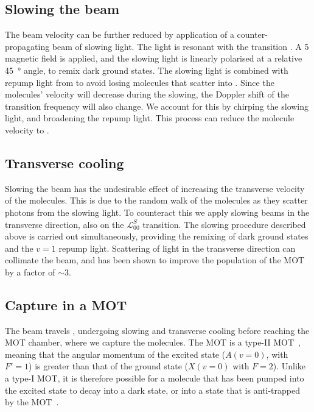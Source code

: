 \subsection*{Slowing the beam}

The beam velocity can be further reduced by application of a counter-propagating
beam of slowing light. The light is resonant with the  transition . A \SI{5}{\gauss} magnetic field is
applied, and the slowing light is linearly polarised at a relative
\SI{45}{\degree} angle, to remix dark ground states. The slowing light is
combined with repump light from 
to avoid losing molecules that scatter into . Since the molecules'
velocity will decrease during the slowing, the Doppler shift of the transition
frequency will also change. We account for this by chirping the slowing light,
and broadening the repump light. This process can reduce the molecule velocity
to .

\subsection*{Transverse cooling}

Slowing the beam has the undesirable effect of increasing the transverse
velocity of the molecules. This is due to the random walk of the molecules as
they scatter photons from the slowing light. To counteract this we apply
slowing beams in the transverse direction, also on the $\mathcal{L}_{00}^S$
transition. The slowing procedure described above is carried out
simultaneously, providing the remixing of dark ground states and the $v=1$
repump light.
%
Scattering of light in the transverse direction can collimate the beam, and has
been shown to improve the population of the MOT by a factor of $\sim3$. 

\subsection*{Capture in a MOT}

The \CaF{} beam travels , undergoing slowing and transverse
cooling before reaching the MOT chamber, where we capture the molecules. The
\CaF{} MOT is a type-II MOT~\cite{}, meaning that the angular momentum of the
excited state ($A(v=0)$, with $F'=1$) is greater than that of the ground state
($X(v=0)$ with $F=2$). Unlike a type-I MOT, it is therefore possible for a
molecule that has been pumped into the excited state to decay into a dark
state, or into a state that is anti-trapped by the MOT~\cite{}.

